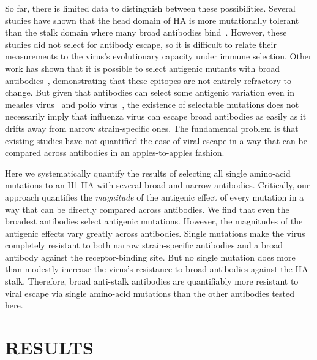 \documentclass[11pt]{article}
\begin{document}
So far, there is limited data to distinguish between these possibilities.
Several studies have shown that the head domain of HA is more mutationally tolerant than the stalk domain where many broad antibodies bind~\citep{thyagarajan2014inherent,wu2014high,heaton2013genome}.
However, these studies did not select for antibody escape, so it is difficult to relate their measurements to the virus's evolutionary capacity under immune selection.
Other work has shown that it is possible to select antigenic mutants with broad antibodies~\citep{yoshida2009cross,chai2016two}, demonstrating that these epitopes are not entirely refractory to change.
But given that antibodies can select some antigenic variation even in measles virus~\citep{birrer1981antigenic,ter1981antigenic} and polio virus~\citep{crainic1983natural,diamond1985antigenic}, the existence of selectable mutations does not necessarily imply that influenza virus can escape broad antibodies as easily as it drifts away from narrow strain-specific ones.
The fundamental problem is that existing studies have not quantified the ease of viral escape in a way that can be compared across antibodies in an apples-to-apples fashion.

Here we systematically quantify the results of selecting all single amino-acid mutations to an H1 HA with several broad and narrow antibodies.
Critically, our approach quantifies the \emph{magnitude} of the antigenic effect of every mutation in a way that can be directly compared across antibodies.
We find that even the broadest antibodies select antigenic mutations.
However, the magnitudes of the antigenic effects vary greatly across antibodies.
Single mutations make the virus completely resistant to both narrow strain-specific antibodies and a broad antibody against the receptor-binding site.
But no single mutation does more than modestly increase the virus's resistance to broad antibodies against the HA stalk.
Therefore, broad anti-stalk antibodies are quantifiably more resistant to viral escape via single amino-acid mutations than the other antibodies tested here. 


\section*{RESULTS}
\label{sec:results}
\end{document}
